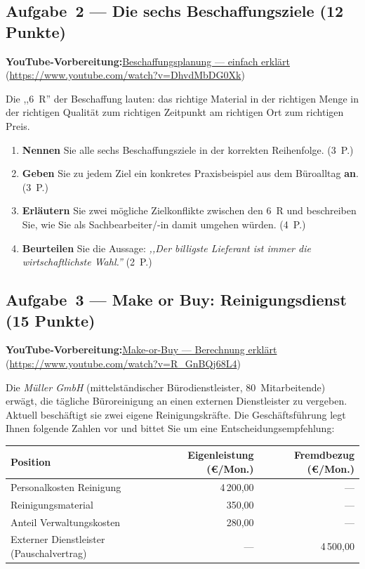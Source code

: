 \documentclass[11pt, a4paper]{article}
\begin{document}
\subsection*{Aufgabe~2 --- Die sechs Beschaffungsziele (12 Punkte)}

\noindent\textbf{\color{bfwAccent}YouTube-Vorbereitung:}\enspace \href{https://www.youtube.com/watch?v=DhvdMbDG0Xk}{Beschaffungsplanung --- einfach erklärt} (\url{https://www.youtube.com/watch?v=DhvdMbDG0Xk})

\medskip
Die ,,6~R'' der Beschaffung lauten: das richtige Material in der richtigen Menge in der
richtigen Qualität zum richtigen Zeitpunkt am richtigen Ort zum richtigen Preis.

\begin{enumerate}[label=(\alph*)]
  \item \textbf{Nennen} Sie alle sechs Beschaffungsziele in der korrekten Reihenfolge. \hfill (3~P.)
  \item \textbf{Geben} Sie zu jedem Ziel ein konkretes Praxisbeispiel aus dem Büroalltag \textbf{an}. \hfill (3~P.)
  \item \textbf{Erläutern} Sie zwei mögliche Zielkonflikte zwischen den 6~R und beschreiben Sie, wie Sie als Sachbearbeiter/-in damit umgehen würden. \hfill (4~P.)
  \item \textbf{Beurteilen} Sie die Aussage: \emph{,,Der billigste Lieferant ist immer die wirtschaftlichste Wahl.''} \hfill (2~P.)
\end{enumerate}

\subsection*{Aufgabe~3 --- Make or Buy: Reinigungsdienst (15 Punkte)}

\noindent\textbf{\color{bfwAccent}YouTube-Vorbereitung:}\enspace \href{https://www.youtube.com/watch?v=R_GnBQj68L4}{Make-or-Buy --- Berechnung erklärt} (\url{https://www.youtube.com/watch?v=R_GnBQj68L4})

\medskip
Die \emph{Müller GmbH} (mittelständischer Bürodienstleister, 80~Mitarbeitende) erwägt,
die tägliche Büroreinigung an einen externen Dienstleister zu vergeben. Aktuell
beschäftigt sie zwei eigene Reinigungskräfte. Die Geschäftsführung legt Ihnen folgende
Zahlen vor und bittet Sie um eine Entscheidungsempfehlung:

\begin{center}
\begin{tabular}{p{6cm} r r}
\toprule
\textbf{Position} & \textbf{Eigenleistung (€/Mon.)} & \textbf{Fremdbezug (€/Mon.)}\\
\midrule
Personalkosten Reinigung & 4\,200,00 & --- \\
Reinigungsmaterial & 350,00 & --- \\
Anteil Verwaltungskosten & 280,00 & --- \\
Externer Dienstleister (Pauschalvertrag) & --- & 4\,500,00 \\
\bottomrule
\end{tabular}
\end{center}
\end{document}
